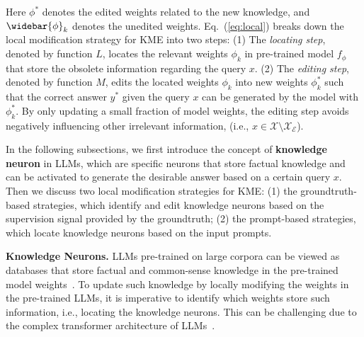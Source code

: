 \documentclass[acmsmall, screen]{acmart}
\begin{document}
Here $\phi^*$ denotes the edited weights related to the new knowledge, and $\widebar{\phi}_k$ denotes the unedited weights.
Eq.~(\ref{eq:local}) breaks down the local modification strategy for KME into two steps: (1) The \textit{locating step}, denoted by function $L$, locates the relevant weights $\phi_k$ in pre-trained model $f_{\phi}$ that store the obsolete information regarding the query $x$. (2) The \textit{editing step}, denoted by function $M$, edits the located weights $\phi_k$ into new weights $\phi_k^{*}$ such that the correct answer $y^{*}$ given the query $x$ can be generated by the model with $\phi_k^{*}$. By only updating a small fraction of model weights, the editing step avoids negatively influencing other irrelevant information, (i.e., $x \in \mathcal{X} \setminus \mathcal{X}_\mathcal{E}$). 

In the following subsections, we first introduce the concept of \textbf{knowledge neuron} in LLMs, which are specific neurons that store factual knowledge and can be activated to generate the desirable answer based on a certain query $x$. Then we discuss two local modification strategies for KME: (1) {the groundtruth-based strategies, which identify and edit knowledge neurons based on the supervision signal provided by the groundtruth}; (2) the prompt-based strategies, which locate knowledge neurons based on the input prompts.


\vspace{0.05in}
\noindent\textsf{\textbf{Knowledge Neurons.}}
LLMs pre-trained on large corpora can be viewed as databases that store factual and common-sense knowledge in the pre-trained model weights~\cite{gupta2023editing}. To update such knowledge by locally modifying the weights in the pre-trained LLMs, it is imperative to identify which weights store such information, i.e., locating the {knowledge neurons}. This can be challenging due to the complex transformer architecture of LLMs~\cite{bakker2022fine}. 
\end{document}

